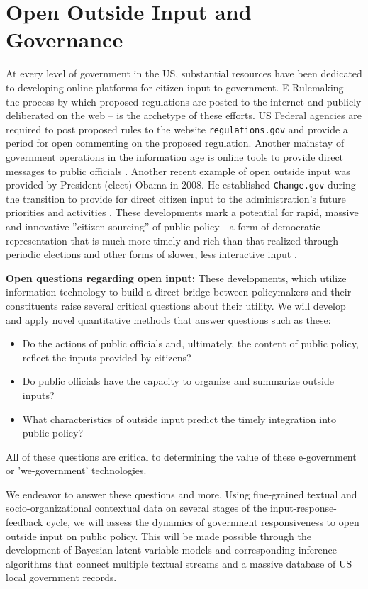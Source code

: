 \section{Open Outside Input and Governance}

At every level of government in the US, substantial resources have been dedicated to developing online platforms for citizen input to government. E-Rulemaking \cite{Coglianese2004} -- the process by which proposed regulations are posted to the internet and publicly deliberated on the web -- is the archetype of these efforts. US Federal agencies are required to post proposed rules to the website \texttt{regulations.gov} and provide a period for open commenting on the proposed regulation. Another mainstay of government operations in the information age is online tools to provide direct messages to public officials \cite{Balla2007}. Another recent example of open outside input was provided by President (elect) Obama in 2008. He established \texttt{Change.gov} during the transition to provide for direct citizen input to the administration's future priorities and activities \cite{Borins2009}. These developments mark a potential for rapid, massive and innovative ''citizen-sourcing'' of public policy - a form of democratic representation that is much more timely and rich than that realized through periodic elections and other forms of slower, less interactive input  \cite{Linders2012}.

{\bf Open questions regarding open input:} These developments, which utilize information technology to build a direct bridge between policymakers and their constituents raise several critical questions about their utility. We will develop and apply novel quantitative methods that answer questions such as these:
\begin{itemize}
\item Do the actions of public officials and, ultimately, the content of public policy, reflect the inputs provided by citizens?
\item Do public officials have the capacity to organize and summarize outside inputs?
\item What characteristics of outside input predict the timely integration into public policy?
\end{itemize} All of these questions are critical to determining the value of these e-government or 'we-government' technologies.


We endeavor to answer these questions and more. Using fine-grained textual and socio-organizational contextual data on several stages of the input-response-feedback cycle, we will assess the dynamics of government responsiveness to open outside input on public policy. This will be made possible through the development of Bayesian latent variable models and corresponding inference algorithms that connect multiple textual streams and a massive database of US local government records. 


